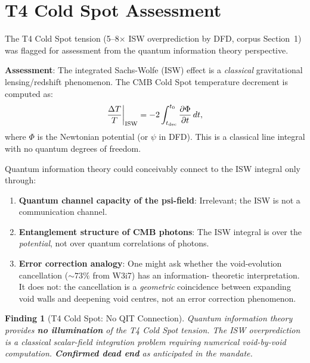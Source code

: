 \documentclass[11pt]{article}
\newtheorem{finding}[theorem]{Finding}
\theoremstyle{definition}
\theoremstyle{remark}
\begin{document}
\section{T4 Cold Spot Assessment}
\label{sec:t4-cold-spot}

The T4 Cold Spot tension (5--8$\times$ ISW overprediction by DFD,
corpus Section~1) was flagged for assessment from the quantum
information theory perspective.

\textbf{Assessment}: The integrated Sachs-Wolfe (ISW) effect is a
\emph{classical} gravitational lensing/redshift phenomenon.  The CMB
Cold Spot temperature decrement is computed as:
\begin{equation}
  \frac{\Delta T}{T}\bigg|_{\rm ISW} = -2\int_{t_{\rm dec}}^{t_0}
  \frac{\partial \Phi}{\partial t}\,dt,
\end{equation}
where $\Phi$ is the Newtonian potential (or $\psi$ in DFD).  This is
a classical line integral with no quantum degrees of freedom.

Quantum information theory could conceivably connect to the ISW integral
only through:
\begin{enumerate}[nosep]
  \item \textbf{Quantum channel capacity of the psi-field}: Irrelevant;
    the ISW is not a communication channel.
  \item \textbf{Entanglement structure of CMB photons}: The ISW integral
    is over the \emph{potential}, not over quantum correlations of photons.
  \item \textbf{Error correction analogy}: One might ask whether the
    void-evolution cancellation ($\sim 73\%$ from W3i7) has an information-
    theoretic interpretation.  It does not: the cancellation is a
    \emph{geometric} coincidence between expanding void walls and
    deepening void centres, not an error correction phenomenon.
\end{enumerate}

\begin{finding}[T4 Cold Spot: No QIT Connection]
\label{finding:t4-negative}
Quantum information theory provides \textbf{no illumination} of the T4
Cold Spot tension.  The ISW overprediction is a classical scalar-field
integration problem requiring numerical void-by-void computation.
\textbf{Confirmed dead end} as anticipated in the mandate.
\end{finding}
\end{document}
